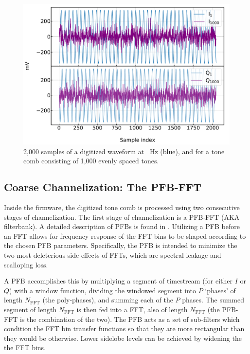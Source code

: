 \begin{figure}[!htbp]
\centering
\includegraphics[width=\textwidth]{figures/readout/sim/adc}
\caption[~2,000  samples of a digitized waveform for a single tone at f = 50.0125~Hz, and 1,000 evenly spaced tones.]{2,000  samples of a digitized waveform at ~Hz (blue), and for a tone comb consisting of 1,000 evenly spaced tones.}
\label{fig:adc}
\end{figure}

\subsection{Coarse Channelization: The PFB-FFT}\label{pfb}

Inside the firmware, the digitized tone comb is processed using two consecutive stages of channelization. The first stage of channelization is a PFB-FFT (AKA filterbank). A detailed description of PFBs is found in \citet{price2016spectrometers}. Utilizing a PFB before an FFT allows for frequency response of the FFT bins to be shaped according to the chosen PFB parameters. Specifically, the PFB is intended to minimize the two most deleterious side-effects of FFTs, which are spectral leakage and scalloping loss.

A PFB accomplishes this by multiplying a segment of timestream (for either $I$ or $Q$) with a window function, dividing the windowed segment into $P$ `phases' of length $N_{\mathrm{FFT}}$ (the poly-phases), and summing each of the $P$ phases. The summed segment of length $N_{\mathrm{FFT}}$ is then fed into a FFT, also of length $N_{\mathrm{FFT}}$ (the PFB-FFT is the combination of the two). The PFB acts as a set of sub-filters which condition the FFT bin transfer functions so that they are more rectangular than they would be otherwise. Lower sidelobe levels can be achieved by widening the the FFT bins.

